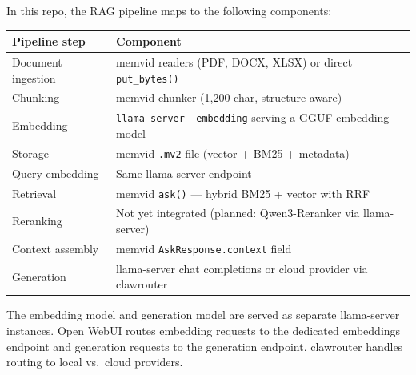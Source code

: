 In this repo, the RAG pipeline maps to the following components:

\begin{center}
\begin{tabular}{ll}
\toprule
\textbf{Pipeline step} & \textbf{Component} \\
\midrule
Document ingestion & memvid readers (PDF, DOCX, XLSX) or direct \texttt{put\_bytes()} \\
Chunking & memvid chunker (1{,}200 char, structure-aware) \\
Embedding & \texttt{llama-server --embedding} serving a GGUF embedding model \\
Storage & memvid \texttt{.mv2} file (vector + BM25 + metadata) \\
Query embedding & Same llama-server endpoint \\
Retrieval & memvid \texttt{ask()} --- hybrid BM25 + vector with RRF \\
Reranking & Not yet integrated (planned: Qwen3-Reranker via llama-server) \\
Context assembly & memvid \texttt{AskResponse.context} field \\
Generation & llama-server chat completions or cloud provider via clawrouter \\
\bottomrule
\end{tabular}
\end{center}

The embedding model and generation model are served as separate llama-server instances.
Open WebUI routes embedding requests to the dedicated embeddings endpoint and generation
requests to the generation endpoint. clawrouter handles routing to local vs.\ cloud providers.
